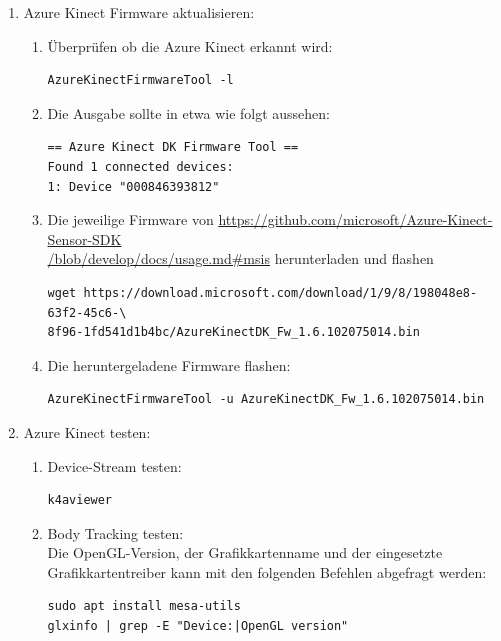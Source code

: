 \begin{enumerate}[label*=\arabic*.]
    \item Azure Kinect Firmware aktualisieren:
        \begin{enumerate}[label*=\arabic*.]
            \item Überprüfen ob die Azure Kinect erkannt wird:
                \begin{lstlisting}[style=bash]
AzureKinectFirmwareTool -l
                \end{lstlisting}

            \item Die Ausgabe sollte in etwa wie folgt aussehen:
                \begin{lstlisting}[style=bash]
 == Azure Kinect DK Firmware Tool ==
Found 1 connected devices:
1: Device "000846393812"
                \end{lstlisting}

            \item Die jeweilige Firmware von \href{https://github.com/microsoft/Azure-Kinect-Sensor-SDK/blob/develop/docs/usage.md#msis}{https://github.com/microsoft/Azure-Kinect-Sensor-SDK\\/blob/develop/docs/usage.md\#msis} herunterladen und flashen
                \begin{lstlisting}[style=bash]
wget https://download.microsoft.com/download/1/9/8/198048e8-63f2-45c6-\
8f96-1fd541d1b4bc/AzureKinectDK_Fw_1.6.102075014.bin
                \end{lstlisting}

            \item Die heruntergeladene Firmware flashen:
                \begin{lstlisting}[style=bash]
AzureKinectFirmwareTool -u AzureKinectDK_Fw_1.6.102075014.bin
                \end{lstlisting}
        \end{enumerate}

    \item Azure Kinect testen:
        \begin{enumerate}[label*=\arabic*.]
            \item Device-Stream testen:
                \begin{lstlisting}[style=bash]
k4aviewer
                \end{lstlisting}

            \item Body Tracking testen:\\
                Die OpenGL-Version, der Grafikkartenname und der eingesetzte Grafikkartentreiber kann mit den folgenden Befehlen abgefragt werden:
                \begin{lstlisting}[style=bash]
sudo apt install mesa-utils
glxinfo | grep -E "Device:|OpenGL version"
                \end{lstlisting}


\end{enumerate}
\end{enumerate}

